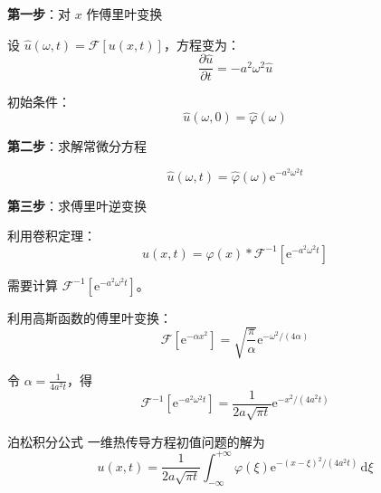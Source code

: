 \textbf{第一步}：对 $x$ 作傅里叶变换

设 $\hat{u}(\omega, t) = \mathcal{F}[u(x, t)]$，方程变为：
\begin{equation}
    \frac{\partial \hat{u}}{\partial t} = -a^2\omega^2\hat{u}
\end{equation}

初始条件：
\begin{equation}
    \hat{u}(\omega, 0) = \hat{\varphi}(\omega)
\end{equation}

\textbf{第二步}：求解常微分方程

\begin{equation}
    \hat{u}(\omega, t) = \hat{\varphi}(\omega)\mathrm{e}^{-a^2\omega^2 t}
\end{equation}

\textbf{第三步}：求傅里叶逆变换

利用卷积定理：
\begin{equation}
    u(x, t) = \varphi(x) * \mathcal{F}^{-1}[\mathrm{e}^{-a^2\omega^2 t}]
\end{equation}

需要计算 $\mathcal{F}^{-1}[\mathrm{e}^{-a^2\omega^2 t}]$。

利用高斯函数的傅里叶变换：
\begin{equation}
    \mathcal{F}[\mathrm{e}^{-\alpha x^2}] = \sqrt{\frac{\pi}{\alpha}}\mathrm{e}^{-\omega^2/(4\alpha)}
\end{equation}

令 $\alpha = \frac{1}{4a^2t}$，得
\begin{equation}
    \mathcal{F}^{-1}[\mathrm{e}^{-a^2\omega^2 t}] = \frac{1}{2a\sqrt{\pi t}}\mathrm{e}^{-x^2/(4a^2t)}
\end{equation}

\begin{dingli}{泊松积分公式}{}
一维热传导方程初值问题的解为
\[
    u(x, t) = \frac{1}{2a\sqrt{\pi t}}\int_{-\infty}^{+\infty} \varphi(\xi)\mathrm{e}^{-(x-\xi)^2/(4a^2t)}\,\mathrm{d}\xi
\]
\end{dingli}

